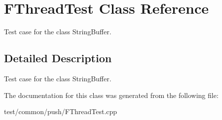 \section{FThread\-Test Class Reference}
\label{classFThreadTest}
Test case for the class String\-Buffer.  




\subsection{Detailed Description}
Test case for the class String\-Buffer. 



The documentation for this class was generated from the following file:\begin{CompactItemize}
\item 
test/common/push/FThread\-Test.cpp\end{CompactItemize}
